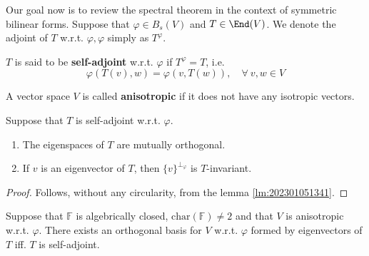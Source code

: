 Our goal now is to review the spectral theorem in the context of symmetric bilinear forms. Suppose that $\varphi \in B_s(V)$ and $T \in \End(V)$. We denote the adjoint of $T$ w.r.t. $\varphi, \varphi$ simply as $T^\varphi$. 

\begin{definition}
  $T$ is said to be \textbf{self-adjoint} w.r.t. $\varphi$ if $T^\varphi = T$, i.e. 
  \[
    \varphi(T(v), w) = \varphi(v, T(w)), \quad \forall~v,w \in V
  \]
\end{definition}

\begin{definition}
  A vector space $V$ is called \textbf{anisotropic} if it does not have any isotropic vectors. 
\end{definition}

\begin{lemma}\label{lm:202301051141}
  Suppose that $T$ is self-adjoint w.r.t. $\varphi$.
  \begin{enumerate}
    \item The eigenspaces of $T$ are mutually orthogonal. 
    \item If $v$ is an eigenvector of $T$, then $\{ v \}^{\perp_\varphi}$ is $T$-invariant. 
  \end{enumerate}
\end{lemma}

\begin{proof}
  Follows, without any circularity, from the lemma \ref{lm:202301051341}.
\end{proof}

\begin{theorem}\label{thm:spectral_theorem_1}
  Suppose that $\mathbb{F}$ is algebrically closed, $\text{char}(\mathbb{F}) \neq 2$ and that $V$ is anisotropic w.r.t. $\varphi$. There exists an orthogonal basis for $V$ w.r.t. $\varphi$ formed by eigenvectors of $T$ iff. $T$ is self-adjoint. 
\end{theorem}


